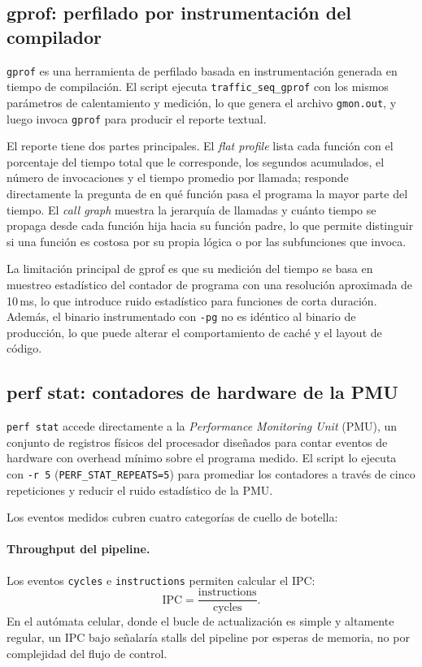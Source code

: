 \subsection{gprof: perfilado por instrumentación del compilador}

\texttt{gprof} es una herramienta de perfilado basada en instrumentación generada
en tiempo de compilación.
El script ejecuta \texttt{traffic\_seq\_gprof} con los mismos parámetros de
calentamiento y medición, lo que genera el archivo \texttt{gmon.out}, y luego
invoca \texttt{gprof} para producir el reporte textual.

El reporte tiene dos partes principales.
El \textit{flat profile} lista cada función con el porcentaje del tiempo total que
le corresponde, los segundos acumulados, el número de invocaciones y el tiempo
promedio por llamada; responde directamente la pregunta de en qué función pasa el
programa la mayor parte del tiempo.
El \textit{call graph} muestra la jerarquía de llamadas y cuánto tiempo se propaga
desde cada función hija hacia su función padre, lo que permite distinguir si una
función es costosa por su propia lógica o por las subfunciones que invoca.

La limitación principal de gprof es que su medición del tiempo se basa en muestreo
estadístico del contador de programa con una resolución aproximada de 10\,ms, lo
que introduce ruido estadístico para funciones de corta duración.
Además, el binario instrumentado con \texttt{-pg} no es idéntico al binario de
producción, lo que puede alterar el comportamiento de caché y el layout de código.


\subsection{perf stat: contadores de hardware de la PMU}

\texttt{perf stat} accede directamente a la \textit{Performance Monitoring Unit}
(PMU), un conjunto de registros físicos del procesador diseñados para contar eventos
de hardware con overhead mínimo sobre el programa medido.
El script lo ejecuta con \texttt{-r 5} (\texttt{PERF\_STAT\_REPEATS=5}) para
promediar los contadores a través de cinco repeticiones y reducir el ruido
estadístico de la PMU.

Los eventos medidos cubren cuatro categorías de cuello de botella:

\paragraph{Throughput del pipeline.}
Los eventos \texttt{cycles} e \texttt{instructions} permiten calcular el IPC:
\begin{equation}
    \text{IPC} = \frac{\text{instructions}}{\text{cycles}}.
\end{equation}
En el autómata celular, donde el bucle de actualización es simple y altamente
regular, un IPC bajo señalaría stalls del pipeline por esperas de memoria, no por
complejidad del flujo de control.

